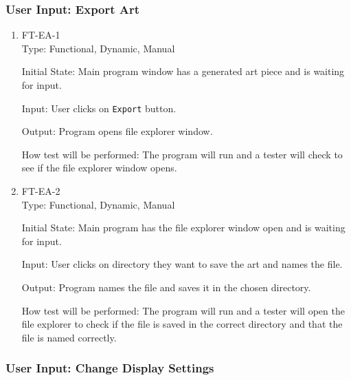 \documentclass[12pt, titlepage]{article}
\begin{document}
\subsubsection{User Input: Export Art}
\begin{enumerate}

\item{FT-EA-1}\\
Type: Functional, Dynamic, Manual

Initial State: Main program window has a generated art piece and is waiting for input. %

Input: User clicks on \texttt{Export} button.

Output: Program opens file explorer window.

How test will be performed: The program will run and a tester will check to see if the file explorer window opens.

\item{FT-EA-2}\\
Type: Functional, Dynamic, Manual

Initial State: Main program has the file explorer window open and is waiting for input. %

Input: User clicks on directory they want to save the art and names the file.

Output: Program names the file and saves it in the chosen directory.

How test will be performed: The program will run and a tester will open the file explorer to check if the file is saved in the correct directory and that the file is named correctly.

\end{enumerate}

\subsubsection{User Input: Change Display Settings}
\end{document}
